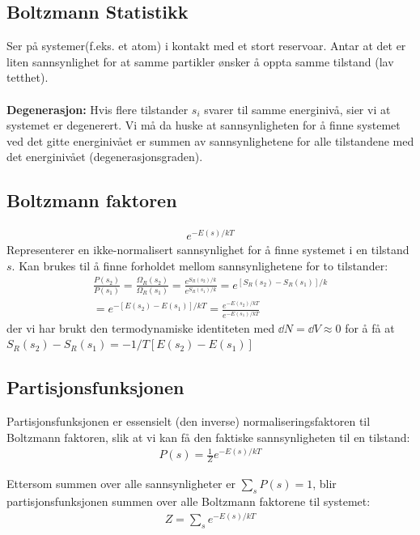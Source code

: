 \documentclass[10pt,a4paper]{article}
\renewcommand{\exp}{e^}
\renewcommand{\b}{\textbf}
\begin{document}
\begin{multicols}{2}
\section{Boltzmann Statistikk}
Ser på systemer(f.eks. et atom) i kontakt med et stort reservoar. Antar at det er liten sannsynlighet for at samme partikler ønsker å oppta samme tilstand (lav tetthet).
\\ \\
\b{Degenerasjon:} Hvis flere tilstander $s_i$ svarer til samme energinivå, sier vi at systemet er degenerert. Vi må da huske at sannsynligheten for å finne systemet ved det gitte energinivået er summen av sannsynlighetene for alle tilstandene med det energinivået (degenerasjonsgraden).


\subsection*{Boltzmann faktoren}
\begin{framed}
\begin{align*}
	\exp{-E(s)/kT}
\end{align*}
Representerer en ikke-normalisert sannsynlighet for å finne systemet i en tilstand $s$. Kan brukes til å finne forholdet mellom sannsynlighetene for to tilstander:
\begin{align*}
	\frac{P(s_2)}{P(s_1)} = \frac{\Omega_R(s_2)}{\Omega_R(s_1)} = \frac{\exp{S_R(s_2)/k}}{\exp{S_R(s_1)/k}}= \exp{[S_R(s_2) - S_R(s_1)]/k} \\
	= \exp{-[E(s_2) - E(s_1)]/kT} = \frac{\exp{-E(s_2)/kT}}{\exp{-E(s_1)/kT}}
\end{align*}
der vi har brukt den termodynamiske identiteten med $\dd N = \dd V \approx 0$ for å få at $S_R(s_2) - S_R(s_1) = -1/T[E(s_2) - E(s_1)]$
\end{framed}


\subsection*{Partisjonsfunksjonen}
\begin{framed}
Partisjonsfunksjonen er essensielt (den inverse) normaliseringsfaktoren til Boltzmann faktoren, slik at vi kan få den faktiske sannsynligheten til en tilstand:
\begin{align*}
	P(s) = \frac{1}{Z}\exp{-E(s)/kT}
\end{align*}

Ettersom summen over alle sannsynligheter er $\sum\limits_s P(s) = 1$, blir partisjonsfunksjonen summen over alle Boltzmann faktorene til systemet:
\begin{align*}
	Z = \sum\limits_s \exp{-E(s)/kT}
\end{align*}
\end{framed}


\end{multicols}
\end{document}

